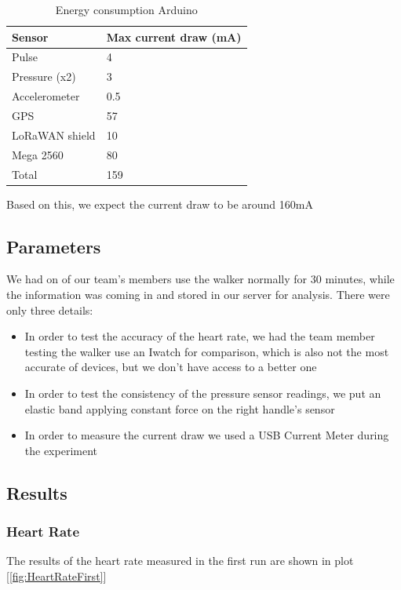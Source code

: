 			\begin{table}[h]
				\begin{tabular}{@{}ll@{}}
					\toprule
					Sensor         & Max current draw (mA) \\ \midrule
					Pulse          & 4                     \\
					Pressure (x2)  & 3                     \\
					Accelerometer  & 0.5                   \\
					GPS            & 57                    \\
					LoRaWAN shield & 10                    \\
					Mega 2560      & 80                    \\
					Total          & 159                   \\ \bottomrule
				\end{tabular}
				\caption[Energy consumption Arduino]{Energy consumption Arduino}
				\label{tab:EnergyConsumption}
			\end{table}

			Based on this, we expect the current draw to be around 160mA

	\subsection{Parameters}
		We had on of our team's members use the walker normally for 30 minutes, while the information was coming in and stored in our server for analysis. There were only three details:

		\begin{itemize}
		  \item In order to test the accuracy of the heart rate, we had the team member testing the walker use an Iwatch for comparison, which is also not the most accurate of devices, but we don't have access to a better one
		  \item In order to test the consistency of the pressure sensor readings, we put an elastic band applying constant force on the right handle's sensor
		  \item In order to measure the current draw we used a USB Current Meter during the experiment
		\end{itemize}

	\subsection{Results}
		
		\subsubsection{Heart Rate}
			The results of the heart rate measured in the first run are shown in plot [\ref{fig:HeartRateFirst}]


